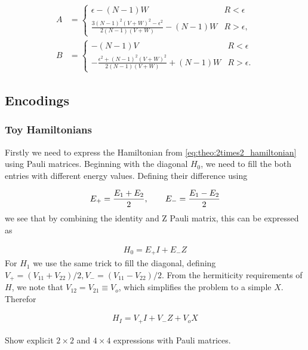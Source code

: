 \begin{align*}
    A &= \begin{cases}
        \epsilon - (N-1)W & R < \epsilon \\
        \frac{3(N-1)^2(V+W)^2 - \epsilon^2}{2(N-1)(V+W)} - (N-1)W & R > \epsilon,
    \end{cases} \\
    B &= \begin{cases}
        -(N-1)V & R < \epsilon \\
        -\frac{\epsilon^2 + (N-1)^2 (V+W)^2 }{2(N-1)(V+W)} + (N-1)W & R > \epsilon.
    \end{cases}
\end{align*}

\subsection{Encodings}
\subsubsection{Toy Hamiltonians}
Firstly we need to express the Hamiltonian from \cref{eq:theo:2times2_hamiltonian} using Pauli matrices. Beginning with the diagonal $H_0$, we need to fill the both entries with different energy values. Defining their difference using

\begin{align*}
    E_+ = \frac{E_1 + E_2}{2},\hspace{20px} E_- = \frac{E_1 - E_2}{2}
\end{align*}
we see that by combining the identity and Z Pauli matrix, this can be expressed as

\begin{align*}
    H_0 = E_+ I + E_- Z
\end{align*}
For $H_1$ we use the same trick to fill the diagonal, defining $V_+ = (V_{11} + V_{22})/2, V_- = (V_{11} - V_{22})/2$. From the hermiticity requirements of $H$, we note that $V_{12} = V_{21} \equiv V_o$, which simplifies the problem to a simple $X$. Therefor

\begin{align*}
    H_I = V_+ I + V_- Z + V_o X
\end{align*}

Show explicit $2\times 2$ and $4\times 4$ expressions with Pauli matrices.
